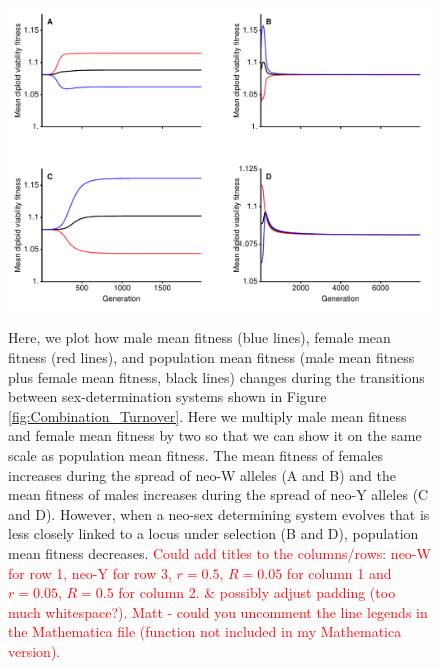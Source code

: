 \documentclass[12pt]{article}
\begin{document}
\begin{figure}[!h]
\centering
\includegraphics[width=\linewidth]{Combination_MeanFit}\\
\caption{
Here, we plot how male mean fitness (blue lines), female mean fitness (red lines), and population mean fitness (male mean fitness plus female mean fitness, black lines) changes during the transitions between sex-determination systems shown in Figure \ref{fig:Combination_Turnover}. 
Here we multiply male mean fitness and female mean fitness by two so that we can show it on the same scale as population mean fitness. 
The mean fitness of females increases during the spread of neo-W alleles (A and B) and the mean fitness of males increases during the spread of neo-Y alleles (C and D). 
However, when a neo-sex determining system evolves that is less closely linked to a locus under selection (B and D), population mean fitness decreases. 
\textcolor{red}{
Could add titles to the columns/rows: neo-W for row 1, neo-Y for row 3, $r=0.5$, $R=0.05$ for column 1 and $r=0.05$, $R=0.5$ for column 2. \& possibly adjust padding (too much whitespace?). Matt - could you uncomment the line legends in the Mathematica file (function not included in my Mathematica version).}
}
\label{fig:Combination_MeanFit}
\end{figure}
\newpage
\end{document}
